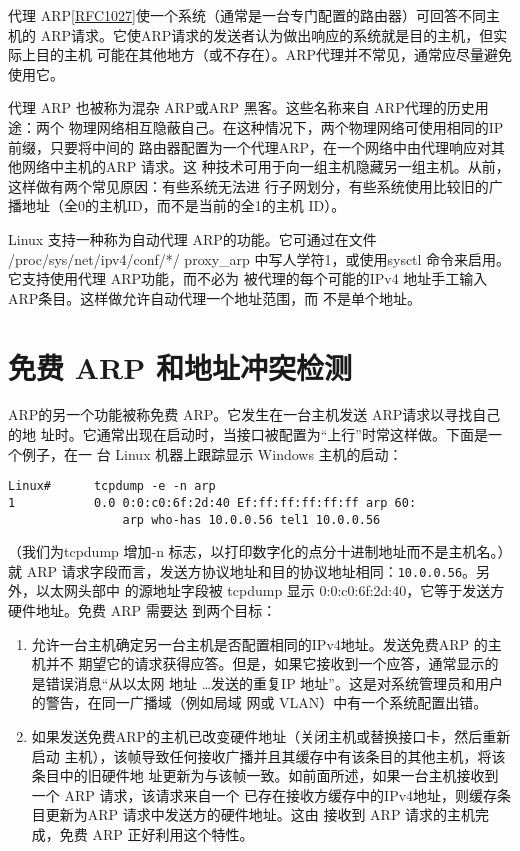 代理 ARP\href{https://www.rfc-editor.org/rfc/rfc1027}{[RFC1027]}使一个系统（通常是一台专门配置的路由器）可回答不同主机的
ARP请求。它使ARP请求的发送者认为做出响应的系统就是目的主机，但实际上目的主机
可能在其他地方（或不存在）。ARP代理并不常见，通常应尽量避免使用它。

代理 ARP 也被称为混杂 ARP或ARP 黑客。这些名称来自 ARP代理的历史用途：两个
物理网络相互隐蔽自己。在这种情况下，两个物理网络可使用相同的IP前缀，只要将中间的
路由器配置为一个代理ARP，在一个网络中由代理响应对其他网络中主机的ARP 请求。这
种技术可用于向一组主机隐藏另一组主机。从前，这样做有两个常见原因：有些系统无法进
行子网划分，有些系统使用比较旧的广播地址（全0的主机ID，而不是当前的全1的主机
ID）。

Linux 支持一种称为自动代理 ARP的功能。它可通过在文件 /proc/sys/net/ipv4/conf/*/
proxy\_arp 中写人学符1，或使用sysctl 命令来启用。它支持使用代理 ARP功能，而不必为
被代理的每个可能的IPv4 地址手工输入 ARP条目。这样做允许自动代理一个地址范围，而
不是单个地址。

\section{免费 ARP 和地址冲突检测}

ARP的另一个功能被称免费 ARP。它发生在一台主机发送 ARP请求以寻找自己的地
址时。它通常出现在启动时，当接口被配置为“上行”时常这样做。下面是一个例子，在一
台 Linux 机器上跟踪显示 Windows 主机的启动：

\begin{verbatim}
Linux#      tcpdump -e -n arp
1           0.0 0:0:c0:6f:2d:40 Ef:ff:ff:ff:ff:ff arp 60:
                arp who-has 10.0.0.56 tel1 10.0.0.56
\end{verbatim}

（我们为tcpdump 增加-n 标志，以打印数字化的点分十进制地址而不是主机名。）就
ARP 请求字段而言，发送方协议地址和目的协议地址相同：\verb|10.0.0.56|。另外，以太网头部中
的源地址字段被 tcpdump 显示 0:0:c0:6f:2d:40，它等于发送方硬件地址。免费 ARP 需要达
到两个目标：

\begin{enumerate}
    \item 允许一台主机确定另一台主机是否配置相同的IPv4地址。发送免费ARP 的主机并不
    期望它的请求获得应答。但是，如果它接收到一个应答，通常显示的是错误消息“从以太网
    地址 \dots 发送的重复IP 地址”。这是对系统管理员和用户的警告，在同一广播域（例如局域
    网或 VLAN）中有一个系统配置出错。
    
    \item 如果发送免费ARP的主机已改变硬件地址（关闭主机或替换接口卡，然后重新启动
    主机），该帧导致任何接收广播并且其缓存中有该条目的其他主机，将该条目中的旧硬件地
    址更新为与该帧一致。如前面所述，如果一台主机接收到一个 ARP 请求，该请求来自一个
    已存在接收方缓存中的IPv4地址，则缓存条目更新为ARP 请求中发送方的硬件地址。这由
    接收到 ARP 请求的主机完成，免费 ARP 正好利用这个特性。
\end{enumerate}

